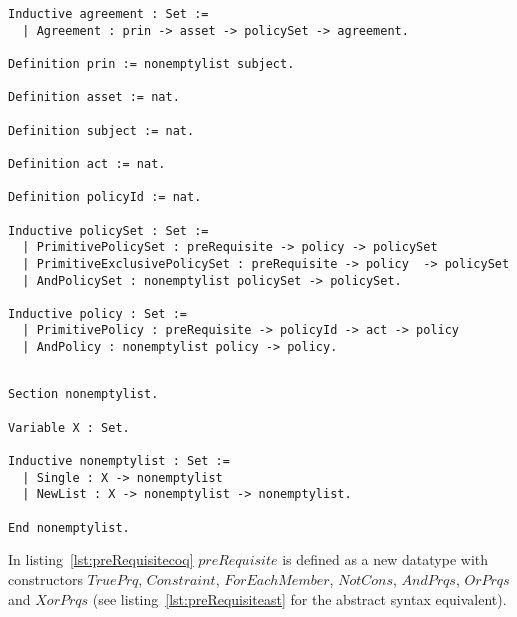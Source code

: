 \lstset{language=Coq}
\begin{minipage}[c]{0.95\textwidth}
\begin{lstlisting}[frame=single, caption={Coq Version of Agreement},label={lst:agreementcoq}]
Inductive agreement : Set :=
  | Agreement : prin -> asset -> policySet -> agreement.

Definition prin := nonemptylist subject.

Definition asset := nat.

Definition subject := nat.

Definition act := nat.

Definition policyId := nat.

Inductive policySet : Set :=
  | PrimitivePolicySet : preRequisite -> policy -> policySet 
  | PrimitiveExclusivePolicySet : preRequisite -> policy  -> policySet 
  | AndPolicySet : nonemptylist policySet -> policySet.

Inductive policy : Set :=
  | PrimitivePolicy : preRequisite -> policyId -> act -> policy 
  | AndPolicy : nonemptylist policy -> policy.

\end{lstlisting}
\end{minipage}



\begin{minipage}[c]{0.95\textwidth}
\begin{lstlisting}

Section nonemptylist.

Variable X : Set.

Inductive nonemptylist : Set :=
  | Single : X -> nonemptylist 
  | NewList : X -> nonemptylist -> nonemptylist.

End nonemptylist.
\end{lstlisting}
\end{minipage}


In listing~\ref{lst:preRequisitecoq} $preRequisite$ is defined as a new datatype with constructors $TruePrq$, $Constraint$, $ForEachMember$, $NotCons$, $AndPrqs$, $OrPrqs$ and $XorPrqs$ (see listing~\ref{lst:preRequisiteast} for the abstract syntax equivalent).

